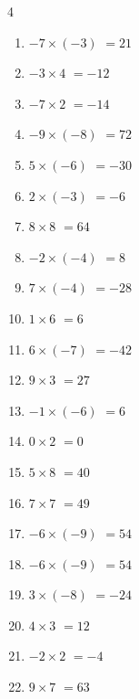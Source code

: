 \begin{multicols}{4}
\begin{enumerate}
  \item $-7\times (-3)$
        $=21$

  \item $-3\times 4$
        $=-12$

  \item $-7\times 2$
        $=-14$

  \item $-9\times (-8)$
        $=72$

  \item $5\times (-6)$
        $=-30$

  \item $2\times (-3)$
        $=-6$

  \item $8\times 8$
        $=64$

  \item $-2\times (-4)$
        $=8$

  \item $7\times (-4)$
        $=-28$

  \item $1\times 6$
        $=6$

  \item $6\times (-7)$
        $=-42$

  \item $9\times 3$
        $=27$

\columnbreak %

  \item $-1\times (-6)$
        $=6$

  \item $0\times 2$
        $=0$

  \item $5\times 8$
        $=40$

  \item $7\times 7$
        $=49$

  \item $-6\times (-9)$
        $=54$

  \item $-6\times (-9)$
        $=54$

  \item $3\times (-8)$
        $=-24$

  \item $4\times 3$
        $=12$

  \item $-2\times 2$
        $=-4$

  \item $9\times 7$
        $=63$


\end{enumerate}
\end{multicols}
